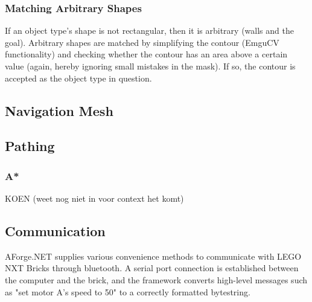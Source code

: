 \documentclass[10pt,twocolumn]{article}
\begin{document}
\subsubsection{Matching Arbitrary Shapes}
If an object type's shape is not rectangular, then it is arbitrary (walls and the goal). Arbitrary shapes are matched by simplifying the contour (EmguCV functionality) and checking whether the contour has an area above a certain value (again, hereby ignoring small mistakes in the mask). If so, the contour is accepted as the object type in question.

\subsection{Navigation Mesh}

\subsection{Pathing}

\subsubsection{A*}
KOEN (weet nog niet in voor context het komt)

\subsection{Communication}
AForge.NET supplies various convenience methods to communicate with LEGO NXT Bricks through bluetooth. A serial port connection is established between the computer and the brick, and the framework converts high-level messages such as "set motor A's speed to 50" to a correctly formatted bytestring.
\end{document}
